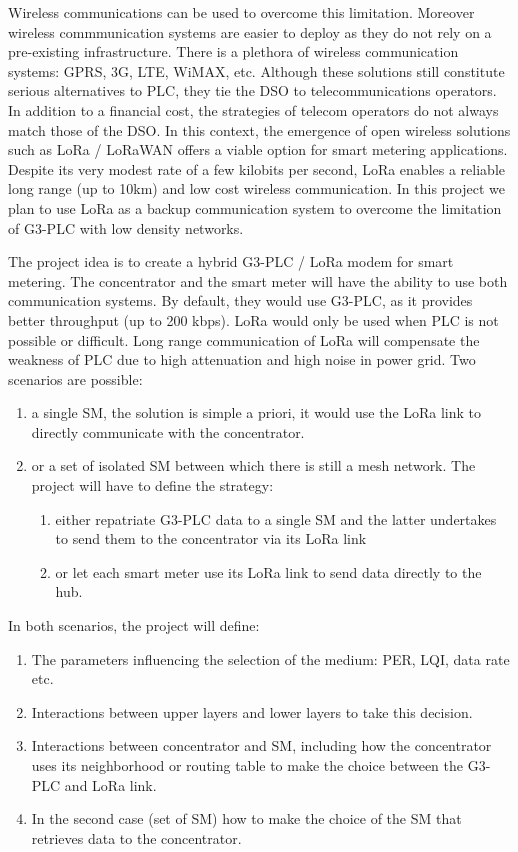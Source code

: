 \documentclass[a4paper,10pt]{article}
\begin{document}
Wireless communications can be used to overcome this
limitation. Moreover wireless commmunication systems are
easier to deploy as they do not rely on a pre-existing
infrastructure. There is a plethora of wireless
communication systems: GPRS, 3G, LTE, WiMAX, etc. Although
these solutions still constitute serious alternatives to
PLC, they tie the DSO to telecommunications operators. In
addition to a financial cost, the strategies of telecom
operators do not always match those of the DSO. In this
context, the emergence of open wireless solutions such as
LoRa / LoRaWAN offers a viable option for smart metering
applications. Despite its very modest rate of a few kilobits
per second, LoRa enables a reliable long range (up to 10km)
and low cost wireless communication. In this project we plan
to use LoRa as a backup communication system to overcome the
limitation of G3-PLC with low density networks.

The project idea is to create a hybrid G3-PLC / LoRa modem
for smart metering. The concentrator and the smart meter
will have the ability to use both communication systems. By
default, they would use G3-PLC, as it provides better
throughput (up to 200 kbps). LoRa would only be used when
PLC is not possible or difficult. Long range communication
of LoRa will compensate the weakness of PLC due to high
attenuation and high noise in power grid. Two scenarios are
possible:

\begin{enumerate}
  \itemsep -0.5em
  \item a single SM, the solution is simple a priori, it
    would use the LoRa link to directly communicate with the
    concentrator.
  \item or a set of isolated SM between which there is still
    a mesh network. The project will have to define the
    strategy:
    \begin{enumerate}
      \itemsep -0.5em
      \item either repatriate G3-PLC data to a single SM and
        the latter undertakes to send them to the
        concentrator via its LoRa link
      \item or let each smart meter use its LoRa link to
        send data directly to the hub.
    \end{enumerate}
\end{enumerate}

In both scenarios, the project will define:

\begin{enumerate}
  \itemsep -0.5em
  \item The parameters influencing the selection of the medium: PER, LQI, data rate etc.
  \item Interactions between upper layers and lower layers to take this decision.
  \item Interactions between concentrator and SM, including how the concentrator uses its neighborhood or routing table to make the choice between the G3-PLC and LoRa link.
  \item In the second case (set of SM) how to make the choice of the SM that retrieves data to the concentrator.
\end{enumerate}
\end{document}
